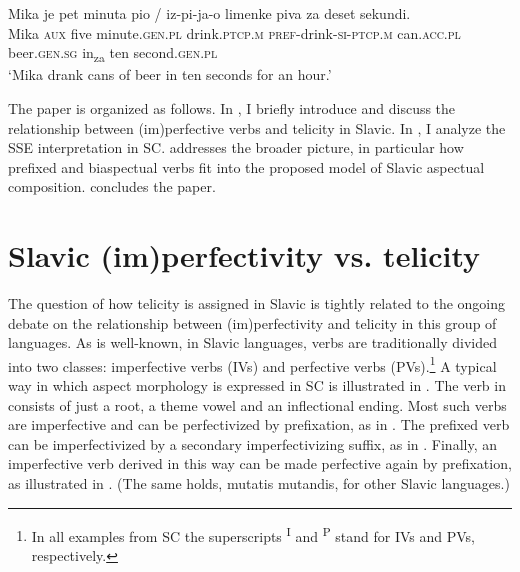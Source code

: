\documentclass[output=paper,colorlinks,citecolor=brown]{langscibook}
\begin{document}
\ea \label{mil:ex:SSE-intro}
\gll Mika   je  pet minuta pio / iz-pi-ja-o limenke piva za deset sekundi. \\
     Mika \textsc{aux} five minute.\textsc{gen.pl} drink.\textsc{ptcp.m} {} \textsc{pref}-drink-\textsc{si-ptcp.m} can.\textsc{acc.pl} beer.\textsc{gen.sg} in\textsubscript{za} ten second.\textsc{gen.pl} \\
\glt `Mika drank cans of beer in ten seconds for an hour.'
\z

\noindent The paper is organized as follows. In , I briefly introduce and discuss the relationship between (im)perfective verbs and telicity in Slavic. In , I analyze the SSE interpretation in SC.  addresses the broader picture, in particular how prefixed and biaspectual verbs fit into the proposed model of Slavic aspectual composition.  concludes the paper.


\section{Slavic (im)perfectivity vs. telicity} \label{mil:sec:SlavicImperfectivityTelicity}

The question of how telicity is assigned in Slavic is tightly related to the ongoing debate on the relationship between (im)perfectivity and telicity in this group of languages. As is well-known, in Slavic languages, verbs are traditionally divided into two classes: imperfective verbs (IVs) and perfective verbs (PVs).\footnote{In all examples from SC the superscripts \textsuperscript{I} and \textsuperscript{P} stand for IVs and PVs, respectively.} A typical way in which aspect morphology is expressed in SC is illustrated in . The verb in  consists of just a root, a theme vowel and an inflectional ending. Most such verbs are imperfective and can be perfectivized by prefixation, as in . The prefixed verb can be imperfectivized by a secondary imperfectivizing suffix, as in . Finally, an imperfective verb derived in this way can be made perfective again by prefixation, as illustrated in . (The same holds, mutatis mutandis, for other Slavic languages.)
\end{document}
